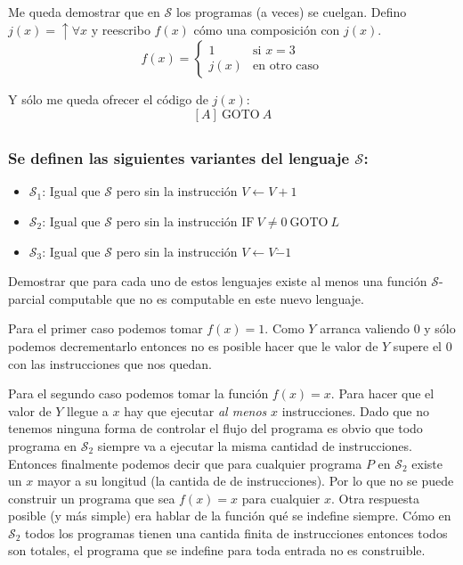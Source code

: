 \documentclass[fleqn, 11pt]{article}
\newcommand{\Scur}{\mathcal{S}}
\newcommand{\indef}{\uparrow}
\newcommand{\into}{\leftarrow}
\newcommand{\IF}{\text{IF}}
\newcommand{\GOTO}{\text{GOTO}}
\begin{document}
Me queda demostrar que en $\Scur$ los programas (a veces) se cuelgan. Defino
$j(x) = \indef \forall x$ y reescribo $f(x)$ cómo una composición con $j(x)$.
\[
	f(x) =
	\begin{cases}
		1    & \text{si } x = 3 \\
		j(x) & \text{en otro caso}
	\end{cases}
\]

Y sólo me queda ofrecer el código de $j(x)$:
\[[A]\ \GOTO\ A\]

\subsection{}

\subsubsection{Se definen las siguientes variantes del lenguaje $\Scur$:}

\begin{itemize}
	\item $\Scur_1$: Igual que $\Scur$ pero sin la instrucción
	$V \into V + 1$
	\item $\Scur_2$: Igual que $\Scur$ pero sin la instrucción
	$\IF\ V \neq 0\ \GOTO\ L$
	\item $\Scur_3$: Igual que $\Scur$ pero sin la instrucción
	$V \into V \dot- 1$
\end{itemize}

Demostrar que para cada uno de estos lenguajes existe al menos una función
$\Scur$-parcial computable que no es computable en este nuevo lenguaje.

Para el primer caso podemos tomar $f(x) = 1$. Como $Y$ arranca valiendo $0$ y
sólo podemos decrementarlo entonces no es posible hacer que le valor de $Y$
supere el $0$ con las instrucciones que nos quedan.

Para el segundo caso podemos tomar la función $f(x) = x$. Para hacer que el
valor de $Y$ llegue a $x$ hay que ejecutar \emph{al menos} $x$ instrucciones.
Dado que no tenemos ninguna forma de controlar el flujo del programa es obvio
que todo programa en $\Scur_2$ siempre va a ejecutar la misma cantidad de
instrucciones. Entonces finalmente podemos decir que para cualquier programa
$P$ en $\Scur_2$ existe un $x$ mayor a su longitud (la cantida de de
instrucciones). Por lo que no se puede construir un programa que sea $f(x) = x$
para cualquier $x$. Otra respuesta posible (y más simple) era hablar de la
función qué se indefine siempre. Cómo en $\Scur_2$ todos los programas tienen
una cantida finita de instrucciones entonces todos son totales, el programa que
se indefine para toda entrada no es construible.
\end{document}
